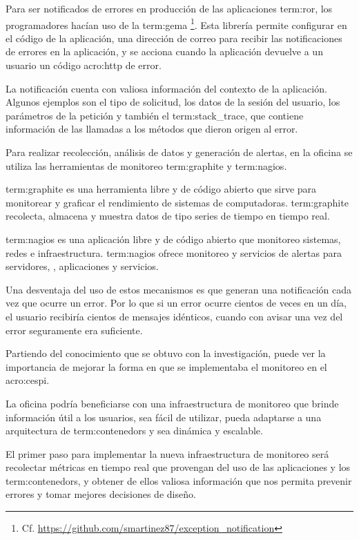 Para ser notificados de errores en producción de las aplicaciones
\gls{term:ror}, los programadores hacían uso de la \gls{term:gema}
\footnote{Cf.
\url{https://github.com/smartinez87/exception_notification}}. Esta librería
permite configurar en el código de la aplicación, una dirección de correo para
recibir las notificaciones de errores en la aplicación, y se acciona cuando la
aplicación devuelve a un usuario un código \gls{acro:http} de error.

La notificación cuenta con valiosa información del contexto de la aplicación.
Algunos ejemplos son el tipo de solicitud, los datos de la sesión del usuario,
los parámetros de la petición y también el \gls{term:stack_trace}, que contiene
información de las llamadas a los métodos que dieron origen al error.

Para realizar recolección, análisis de datos y generación de alertas, en la
oficina se utiliza las herramientas de monitoreo \gls{term:graphite} y
\gls{term:nagios}.

\gls{term:graphite} es una herramienta libre y de código abierto que sirve para
monitorear y graficar el rendimiento de sistemas de computadoras.
\gls{term:graphite} recolecta, almacena y muestra datos de tipo series de
tiempo en tiempo real.

\gls{term:nagios} es una aplicación libre y de código abierto que monitoreo
sistemas, redes e infraestructura. \gls{term:nagios} ofrece monitoreo y
servicios de alertas para servidores, , aplicaciones y servicios.

Una desventaja del uso de estos mecanismos es que generan una notificación cada
vez que ocurre un error. Por lo que si un error ocurre cientos de veces en un
día, el usuario recibiría cientos de mensajes idénticos, cuando con avisar una
vez del error seguramente era suficiente.

Partiendo del conocimiento que se obtuvo con la investigación, puede ver la
importancia de mejorar la forma en que se implementaba el monitoreo en el
\gls{acro:cespi}.

La oficina podría beneficiarse con una infraestructura de monitoreo que brinde
información útil a los usuarios, sea fácil de utilizar, pueda adaptarse a una
arquitectura de \glspl{term:contenedor} y sea dinámica y escalable.

El primer paso para implementar la nueva infraestructura de monitoreo será
recolectar métricas en tiempo real que provengan del uso de las aplicaciones y
los \glspl{term:contenedor}, y obtener de ellos valiosa información que nos
permita prevenir errores y tomar mejores decisiones de diseño.

